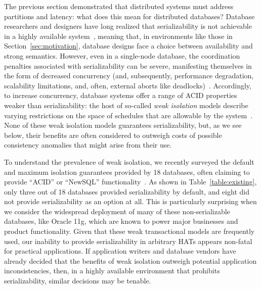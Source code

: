 The previous section demonstrated that distributed systems must
address partitions and latency: what does this mean for distributed
databases? Database researchers and designers have long realized that
serializability is not achievable in a highly available
system~\cite{davidson-survey}, meaning that, in environments like
those in Section~\ref{sec:motivation}, database designs face a choice
between availability and strong semantics. However, even in a
single-node database, the coordination penalties associated with
serializability can be severe, manifesting themselves in the form of
decreased concurrency (and, subsequently, performance degradation,
scalability limitations, and, often, external aborts like
deadlocks)~\cite{gray-isolation}. Accordingly, to increase
concurrency, database systems offer a range of ACID properties weaker
than serializability: the host of so-called \textit{weak isolation}
models describe varying restrictions on the space of schedules that
are allowable by the system~\cite{adya, ansi-sql, ansicritique}. None
of these weak isolation models guarantees serializability, but, as we see below,
their benefits are often considered to outweigh costs of possible
consistency anomalies that might arise from their use.

To understand the prevalence of weak isolation, we
recently surveyed the default and maximum isolation guarantees provided by
18 databases, often claiming to provide ``ACID'' or ``NewSQL''
functionality~\cite{hat-hotos}. As shown in
Table~\ref{table:existing}, only three out of 18 databases provided
serializability by default, and eight did not provide serializability
as an option at all. This is particularly surprising when we consider
the widespread deployment of many of these non-serializable databases,
like Oracle 11g, which are known to power major businesses and product
functionality. Given that these weak transactional models are frequently
used, our inability to provide serializability in arbitrary HATs
appears non-fatal for practical applications. If application writers
and database vendors have already decided that the benefits of weak
isolation outweigh potential application inconsistencies, then, in a
highly available environment that prohibits serializability, similar
decisions may be tenable.

